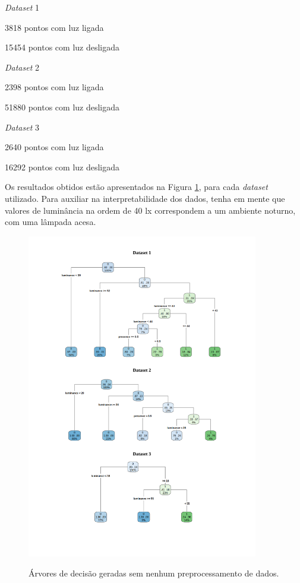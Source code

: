 \begin{itemize_compact}
	\item \textit{Dataset} 1
	\begin{itemize_compact}
		\item 3818 pontos com luz ligada
		\item 15454 pontos com luz desligada
	\end{itemize_compact}
		\item \textit{Dataset} 2
	\begin{itemize_compact}
		\item 2398 pontos com luz ligada
		\item 51880 pontos com luz desligada
	\end{itemize_compact}
		\item \textit{Dataset} 3
	\begin{itemize_compact}
		\item 2640 pontos com luz ligada
		\item 16292 pontos com luz desligada
	\end{itemize_compact}
\end{itemize_compact}

Os resultados obtidos estão apresentados na Figura \ref{fig:teste_1}, para cada \textit{dataset} utilizado. Para auxiliar na interpretabilidade dos dados, tenha em mente que valores de luminância na ordem de 40 lx correspondem a um ambiente noturno, com uma lâmpada acesa.

\begin{figure}[hp]
	\centering
	\caption{Árvores de decisão geradas sem nenhum preprocessamento de dados.}
  \includegraphics[width=0.9\textwidth]{imagens/teste_learning/1.pdf}
  \label{fig:teste_1}  
\end{figure}


